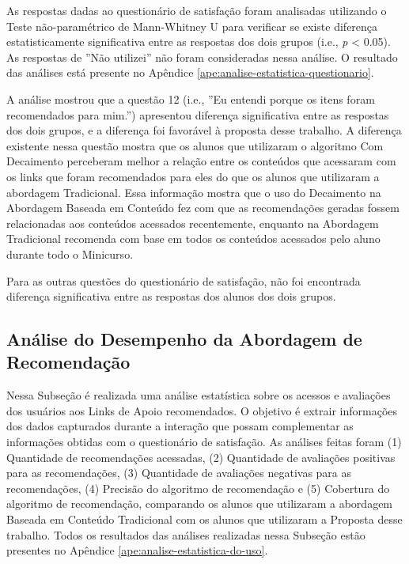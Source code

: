 As respostas dadas ao questionário de satisfação foram analisadas utilizando o Teste não-paramétrico de
Mann-Whitney U para verificar se existe diferença estatisticamente significativa entre as respostas dos dois grupos (i.e., \textit{p} < 0.05).
As respostas de ''Não utilizei'' não foram consideradas nessa análise. O resultado das análises está presente no Apêndice
\ref{ape:analise-estatistica-questionario}.

A análise mostrou que a questão 12 (i.e., ''Eu entendi porque os itens foram recomendados para mim.'') apresentou
diferença significativa entre as respostas dos dois grupos, e a diferença foi favorável à proposta desse trabalho. A
diferença existente nessa questão mostra que os alunos que utilizaram o algoritmo Com Decaimento perceberam
melhor a relação entre os conteúdos que acessaram com os links que foram recomendados para eles do que os alunos que
utilizaram a abordagem Tradicional. Essa informação mostra que o uso do Decaimento na Abordagem Baseada em Conteúdo fez com
que as recomendações geradas fossem relacionadas aos conteúdos acessados recentemente, enquanto na Abordagem Tradicional
recomenda com base em todos os conteúdos acessados pelo aluno durante todo o Minicurso.

Para as outras questões do questionário de satisfação, não foi encontrada diferença significativa entre as respostas dos
alunos dos dois grupos.

\subsection{Análise do Desempenho da Abordagem de Recomendação}\label{subsection:analise-uso-sr}

Nessa Subseção é realizada uma análise estatística sobre os acessos e avaliações dos usuários aos Links de Apoio recomendados.
O objetivo é extrair informações dos dados capturados durante a interação que possam complementar as informações obtidas
com o questionário de satisfação. As análises feitas foram (1) Quantidade de recomendações acessadas,
(2) Quantidade de avaliações positivas para as recomendações, (3) Quantidade de avaliações negativas para as recomendações,
(4) Precisão do algoritmo de recomendação e (5) Cobertura do algoritmo de recomendação, comparando os alunos que utilizaram
a abordagem Baseada em Conteúdo Tradicional com os alunos que utilizaram a Proposta desse trabalho. Todos
os resultados das análises realizadas nessa Subseção estão presentes no Apêndice \ref{ape:analise-estatistica-do-uso}.


